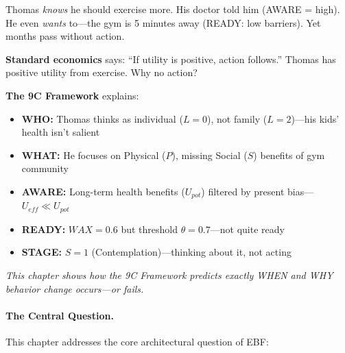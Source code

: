 \begin{tcolorbox}[colback=gray!5!white, colframe=gray!75!black,
    title=\textbf{Why This Matters: Thomas's Fitness Journey}]
\small
Thomas \emph{knows} he should exercise more. His doctor told him (AWARE = high). He even \emph{wants} to---the gym is 5 minutes away (READY: low barriers). Yet months pass without action.

\textbf{Standard economics} says: ``If utility is positive, action follows.'' Thomas has positive utility from exercise. Why no action?

\textbf{The 9C Framework} explains:
\begin{itemize}[nosep]
    \item \textbf{WHO:} Thomas thinks as individual ($L=0$), not family ($L=2$)---his kids' health isn't salient
    \item \textbf{WHAT:} He focuses on Physical ($P$), missing Social ($S$) benefits of gym community
    \item \textbf{AWARE:} Long-term health benefits ($U_{pot}$) filtered by present bias---$U_{eff} \ll U_{pot}$
    \item \textbf{READY:} $WAX = 0.6$ but threshold $\theta = 0.7$---not quite ready
    \item \textbf{STAGE:} $S = 1$ (Contemplation)---thinking about it, not acting
\end{itemize}

\textit{This chapter shows how the 9C Framework predicts exactly WHEN and WHY behavior change occurs---or fails.}
\end{tcolorbox}

\paragraph{The Central Question.}
This chapter addresses the core architectural question of EBF:

\begin{center}
\end{center}

